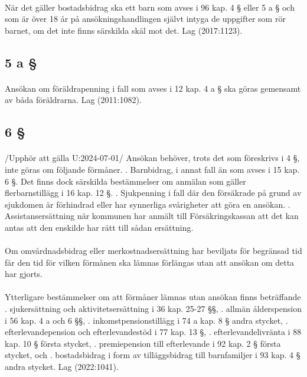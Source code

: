 \documentclass[a4paper,notitlepage,openany,10pt]{book}
\begin{document}
\paragraph*{}
När det gäller bostadsbidrag ska ett barn som avses i 96 kap. 4 § eller 5 a § och som är över 18 år på ansökningshandlingen självt intyga de uppgifter som rör barnet, om det inte finns särskilda skäl mot det.
Lag (2017:1123).
\subsection*{5 a §}
\paragraph*{}
Ansökan om föräldrapenning i fall som avses i 12 kap. 4 a § ska göras gemensamt av båda föräldrarna.
Lag (2011:1082).
\subsection*{6 §}
\paragraph*{}
/Upphör att gälla U:2024-07-01/
Ansökan behöver, trots det som föreskrivs i 4 §, inte göras om följande förmåner.
. Barnbidrag, i annat fall än som avses i 15 kap. 6 §. Det finns dock särskilda bestämmelser om anmälan som gäller flerbarnstillägg i 16 kap. 12 §.
. Sjukpenning i fall där den försäkrade på grund av sjukdomen är förhindrad eller har synnerliga svårigheter att göra en ansökan.
. Assistansersättning när kommunen har anmält till Försäkringskassan att det kan antas att den enskilde har rätt till sådan ersättning.
\paragraph*{}
Om omvårdnadsbidrag eller merkostnadsersättning har beviljats för begränsad tid får den tid för vilken förmånen ska lämnas förlängas utan att ansökan om detta har gjorts.
\paragraph*{}
Ytterligare bestämmelser om att förmåner lämnas utan ansökan finns beträffande
. sjukersättning och aktivitetsersättning i 36 kap. 25-27 §§,
. allmän ålderspension i 56 kap. 4 a och 6 §§,
. inkomstpensionstillägg i 74 a kap. 8 § andra stycket,
. efterlevandepension och efterlevandestöd i 77 kap. 13 §,
. efterlevandelivränta i 88 kap. 10 § första stycket,
. premiepension till efterlevande i 92 kap. 2 § första stycket, och
. bostadsbidrag i form av tilläggsbidrag till barnfamiljer i 93 kap. 4 § andra stycket.
Lag (2022:1041).
\end{document}
